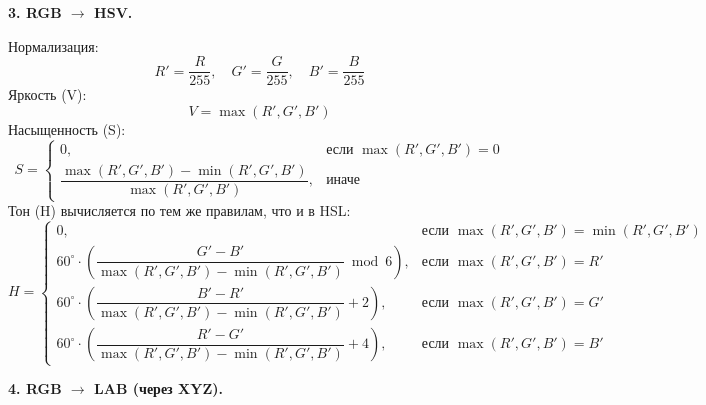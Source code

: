 \documentclass[12pt,a4paper]{article}
\begin{document}
\textbf{3. RGB \(\to\) HSV.}

Нормализация:
\[
R' = \frac{R}{255},\quad G' = \frac{G}{255},\quad B' = \frac{B}{255}
\]
Яркость (V):
\[
V = \max(R', G', B')
\]
Насыщенность (S):
\[
S = \begin{cases}
0, & \text{если } \max(R', G', B') = 0 \\[8pt]
\dfrac{\max(R', G', B') - \min(R', G', B')}{\max(R', G', B')}, & \text{иначе}
\end{cases}
\]
Тон (H) вычисляется по тем же правилам, что и в HSL:
\[
H = \begin{cases}
0, & \text{если } \max(R', G', B') = \min(R', G', B') \\[8pt]
60^\circ \cdot \left( \dfrac{G' - B'}{\max(R', G', B') - \min(R', G', B')} \bmod 6 \right), & \text{если } \max(R', G', B') = R' \\[12pt]
60^\circ \cdot \left( \dfrac{B' - R'}{\max(R', G', B') - \min(R', G', B')} + 2 \right), & \text{если } \max(R', G', B') = G' \\[12pt]
60^\circ \cdot \left( \dfrac{R' - G'}{\max(R', G', B') - \min(R', G', B')} + 4 \right), & \text{если } \max(R', G', B') = B'
\end{cases}
\]

\textbf{4. RGB \(\to\) LAB (через XYZ).}
\end{document}
